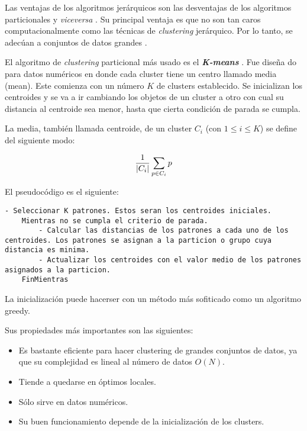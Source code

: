     Las ventajas de los algoritmos jerárquicos son las desventajas de los algoritmos
particionales y \emph{viceversa} \cite{PSO_0}. Su principal ventaja es que no
son tan caros computacionalmente como las técnicas de \emph{clustering}
jerárquico. Por lo tanto, se adecúan a conjuntos de datos grandes \cite{PSO_0}.

    El algoritmo de \emph{clustering} particional más usado es el
\textbf{\emph{K-means}} \cite{DC_4}. 
Fue dise\~na do para datos num\'ericos en donde cada cluster tiene un centro llamado
media (mean). Este comienza con un n\'umero $K$ de clusters establecido. Se inicializan
los centroides y se va a ir cambiando
los objetos de un cluster a otro con cual su distancia al centroide sea menor,
hasta que cierta condici\'on de parada se cumpla.\cite{GePo2010}

La media, tambi\'en llamada centroide,  de un cluster $C_i$ (con $1 \leq i \leq K$)
se define del siguiente modo:

\[
{1 \over |C_{i}|} \sum_{p \in C_{i}} p
\]

El pseudoc\'odigo es el siguiente:

\begin{lstlisting}[float=h, caption=Algoritmo General K-means]
    - Seleccionar K patrones. Estos seran los centroides iniciales.
    Mientras no se cumpla el criterio de parada.
        - Calcular las distancias de los patrones a cada uno de los centroides. Los patrones se asignan a la particion o grupo cuya distancia es minima.
        - Actualizar los centroides con el valor medio de los patrones asignados a la particion.
    FinMientras
\end{lstlisting}

La inicializaci\'on puede hacerser con un m\'etodo m\'as
sofiticado como un algoritmo greedy.

Sus propiedades m\'as importantes son las siguientes:

\begin{itemize}

\item Es bastante eficiente para hacer clustering de grandes conjuntos de datos,
ya que su complejidad es lineal al n\'umero de datos $O(N)$.

\item Tiende a quedarse en \'optimos locales.

\item S\'olo sirve en datos num\'ericos.

\item Su buen funcionamiento depende de la inicializaci\'on de los clusters.

\end{itemize}


